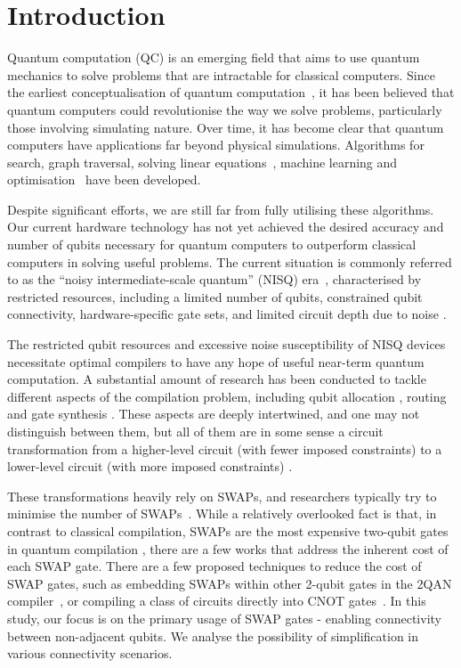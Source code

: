 \chapter{Introduction}

Quantum computation (QC) is an emerging field that aims to use quantum mechanics to solve problems that are intractable for classical computers. Since the earliest conceptualisation of quantum computation~\cite{feynman1986}, it has been believed that quantum computers could revolutionise the way we solve problems, particularly those involving simulating nature. Over time, it has become clear that quantum computers have applications far beyond physical simulations. Algorithms for search, graph traversal, solving linear equations~\cite{montanaro2016}, machine learning and optimisation~\cite{jordan2023} have been developed.

Despite significant efforts, we are still far from fully utilising these algorithms. Our current hardware technology has not yet achieved the desired accuracy and number of qubits necessary for quantum computers to outperform classical computers in solving useful problems. The current situation is commonly referred to as the ``noisy intermediate-scale quantum'' (NISQ) era~\cite{preskill2018}, characterised by restricted resources, including a limited number of qubits, constrained qubit connectivity, hardware-specific gate sets, and limited circuit depth due to noise \cite{cross2019}.

The restricted qubit resources and excessive noise susceptibility of NISQ devices necessitate optimal compilers to have any hope of useful near-term quantum computation. A substantial amount of research has been conducted to tackle different aspects of the compilation problem, including qubit allocation \cite{itoko2019,siraichi2018,paler2019,zhang2021,li2019}, routing \cite{childs,itoko2019,cowtan2019,nash2020,kissinger2019} and gate synthesis \cite{shende2006,vatan2004,vatan2004a,shende2004,barenco1995,dawson2006}. These aspects are deeply intertwined, and one may not distinguish between them, but all of them are in some sense a circuit transformation from a higher-level circuit (with fewer imposed constraints) to a lower-level circuit (with more imposed constraints) \cite{hundt2022}.

These transformations heavily rely on SWAPs, and researchers typically try to minimise the number of SWAPs~\cite{childs,qiskit2023,sivarajah2021,itoko2019,li2019}. While a relatively overlooked fact is that, in contrast to classical compilation, SWAPs are the most expensive two-qubit gates in quantum compilation \cite{vatan2004}, there are a few works that address the inherent cost of each SWAP gate. There are a few proposed techniques to reduce the cost of SWAP gates, such as embedding SWAPs within other 2-qubit gates in the 2QAN compiler~\cite{lao2021}, or compiling a class of circuits directly into CNOT gates~\cite{kissinger2019,nash2020}. In this study, our focus is on the primary usage of SWAP gates - enabling connectivity between non-adjacent qubits. We analyse the possibility of simplification in various connectivity scenarios.

